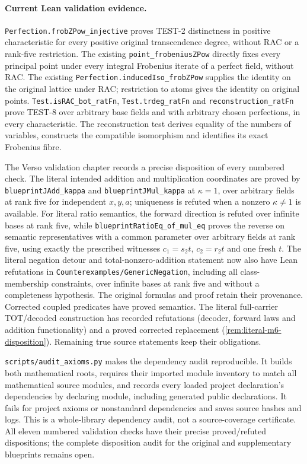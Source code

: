 \documentclass[11pt,oneside]{article}
\theoremstyle{definition}
\theoremstyle{remark}
\newcommand{\lean}[1]{\nolinkurl{#1}}
\begin{document}
\paragraph{Current Lean validation evidence.}
\lean{Perfection.frobZPow_injective} proves TEST-2 distinctness in positive characteristic
for every positive original transcendence degree, without RAC or a rank-five restriction.  The existing
\lean{point_frobeniusZPow} directly fixes every principal point under every integral
Frobenius iterate of a perfect field, without RAC. The existing
\lean{Perfection.inducedIso_frobZPow} supplies the identity on the original lattice under RAC;
restriction to atoms gives the identity on original points.
\lean{Test.isRAC_bot_ratFn}, \lean{Test.trdeg_ratFn} and \lean{reconstruction_ratFn}
prove TEST-8 over arbitrary base fields and with arbitrary chosen perfections, in every
characteristic.  The reconstruction test derives equality of the numbers of variables,
constructs the compatible isomorphism and identifies its exact Frobenius fibre.

The Verso validation chapter records a precise disposition of every numbered check.
The literal intended addition and multiplication coordinates are proved by
\lean{blueprintJAdd_kappa} and \lean{blueprintJMul_kappa} at $\kappa=1$, over arbitrary
fields at rank five for independent $x,y,a$; uniqueness is refuted when a nonzero
$\kappa\ne1$ is available. For literal ratio semantics, the forward direction is refuted
over infinite bases at rank five, while \lean{blueprintRatioEq_of_mul_eq} proves the reverse
on semantic representatives with a common parameter over arbitrary fields at rank five,
using exactly the prescribed witnesses $c_1=s_2t$, $c_2=r_2t$ and one fresh $t$.  The literal
negation
detour and total-nonzero-addition statement now also have Lean refutations in
\lean{Counterexamples/GenericNegation}, including all class-membership constraints,
over infinite bases at rank five and without a completeness hypothesis. The original
formulas and proof retain their provenance. Corrected coupled predicates have proved
semantics. The literal full-carrier TOT/decoded construction has recorded refutations
(decoder, forward laws and addition functionality) and a proved corrected replacement
(\cref{rem:literal-m6-disposition}). Remaining true source statements keep their obligations.

\lean{scripts/audit_axioms.py} makes the dependency audit reproducible.  It builds both
mathematical roots, requires their imported module inventory to match all mathematical
source modules, and records every loaded project declaration's dependencies by declaring
module, including generated public declarations.  It fails for project axioms or
nonstandard dependencies and saves source hashes and logs.  This is a whole-library
dependency audit, not a source-coverage certificate. All eleven numbered validation
checks have their precise proved/refuted dispositions; the complete disposition audit
for the original and supplementary blueprints remains open.
\end{document}
